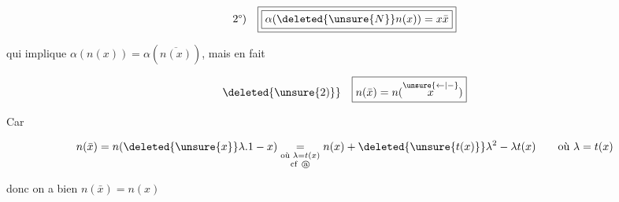 
\[
\text{2°)}\quad\boxed{\boxed{\alpha(\deleted{\unsure{N}}n(x))=x\bar x}}
\]

qui implique $\alpha(n(x))=\alpha(\overline{n(x)})$, mais en  fait

\[
\deleted{\unsure{2)}}\quad\boxed{n(\bar x)=n(\overset{\unsure{\leftarrow|-}}{x})}
\]

Car

\[
n(\bar x)=n(\deleted{\unsure{x}}\lambda.1-x)\underset{\substack{\text{où }\lambda=t(x)\\\mathrm{cf}\ \text{\textcircled{a}}}}{=}
n(x)+\deleted{\unsure{t(x)}}\lambda^2-\lambda t(x)\qquad\text{où }\lambda=t(x)
\]

donc on a bien $n(\bar x)=n(x)$



